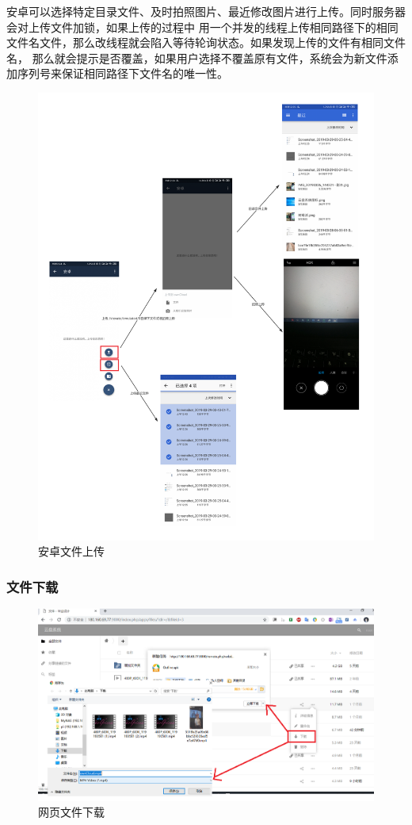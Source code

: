 \par 安卓可以选择特定目录文件、及时拍照图片、最近修改图片进行上传。同时服务器会对上传文件加锁，如果上传的过程中
用一个并发的线程上传相同路径下的相同文件名文件，那么改线程就会陷入等待轮询状态。如果发现上传的文件有相同文件名，
那么就会提示是否覆盖，如果用户选择不覆盖原有文件，系统会为新文件添加序列号来保证相同路径下文件名的唯一性。
\begin{figure}[H]
    \centering
    \includegraphics[width=130mm]{./figures/android_file_upload.png}
    \caption{安卓文件上传}
  \end{figure}
\subsubsection{文件下载}
\begin{figure}[H]
    \centering
    \includegraphics[width=130mm]{./figures/web_file_download.png}
    \caption{网页文件下载}
  \end{figure}


